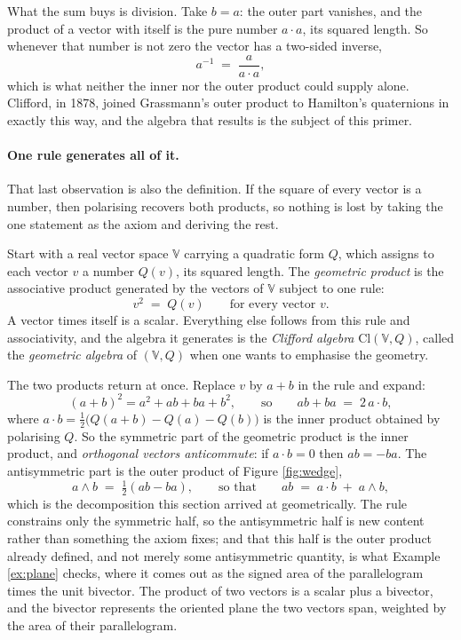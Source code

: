 \documentclass[11pt]{article}
\theoremstyle{plain}
\theoremstyle{definition}
\newcommand{\Cl}{\mathrm{Cl}}
\begin{document}
What the sum buys is division. Take $b = a$: the outer part vanishes, and the product of a vector with itself is the pure number $a \cdot a$, its squared length. So whenever that number is not zero the vector has a two-sided inverse,
\[
a^{-1} \;=\; \frac{a}{a \cdot a} ,
\]
which is what neither the inner nor the outer product could supply alone. Clifford, in 1878, joined Grassmann's outer product to Hamilton's quaternions in exactly this way, and the algebra that results is the subject of this primer.

\paragraph{One rule generates all of it.} That last observation is also the definition. If the square of every vector is a number, then polarising recovers both products, so nothing is lost by taking the one statement as the axiom and deriving the rest.

Start with a real vector space $\mathbb{V}$ carrying a quadratic form $Q$, which assigns to each vector $v$ a number $Q(v)$, its squared length. The \emph{geometric product} is the associative product generated by the vectors of $\mathbb{V}$ subject to one rule:
\[
v^{2} \;=\; Q(v) \qquad \text{for every vector } v .
\]
A vector times itself is a scalar. Everything else follows from this rule and associativity, and the algebra it generates is the \emph{Clifford algebra} $\Cl(\mathbb{V}, Q)$, called the \emph{geometric algebra} of $(\mathbb{V}, Q)$ when one wants to emphasise the geometry.

The two products return at once. Replace $v$ by $a + b$ in the rule and expand:
\[
(a+b)^{2} = a^{2} + ab + ba + b^{2}, \qquad \text{so} \qquad ab + ba \;=\; 2\, a \cdot b ,
\]
where $a \cdot b = \tfrac12\bigl(Q(a+b) - Q(a) - Q(b)\bigr)$ is the inner product obtained by polarising $Q$. So the symmetric part of the geometric product is the inner product, and \emph{orthogonal vectors anticommute}: if $a \cdot b = 0$ then $ab = -ba$. The antisymmetric part is the outer product of Figure \ref{fig:wedge},
\[
a \wedge b \;=\; \tfrac12 (ab - ba), \qquad \text{so that} \qquad ab \;=\; a \cdot b \;+\; a \wedge b ,
\]
which is the decomposition this section arrived at geometrically. The rule constrains only the symmetric half, so the antisymmetric half is new content rather than something the axiom fixes; and that this half is the outer product already defined, and not merely some antisymmetric quantity, is what Example \ref{ex:plane} checks, where it comes out as the signed area of the parallelogram times the unit bivector. The product of two vectors is a scalar plus a bivector, and the bivector represents the oriented plane the two vectors span, weighted by the area of their parallelogram.
\end{document}
